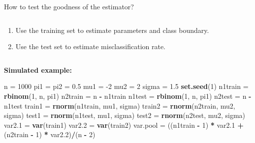 \documentclass[10pt,ignorenonframetext,]{beamer}
\newenvironment{Shaded}{\begin{snugshade}}{\end{snugshade}}
\newcommand{\DecValTok}[1]{\textcolor[rgb]{0.00,0.00,0.81}{#1}}
\newcommand{\FloatTok}[1]{\textcolor[rgb]{0.00,0.00,0.81}{#1}}
\newcommand{\KeywordTok}[1]{\textcolor[rgb]{0.13,0.29,0.53}{\textbf{#1}}}
\newcommand{\NormalTok}[1]{#1}
\newcommand{\OperatorTok}[1]{\textcolor[rgb]{0.81,0.36,0.00}{\textbf{#1}}}
\newcommand{\StringTok}[1]{\textcolor[rgb]{0.31,0.60,0.02}{#1}}
\providecommand{\tightlist}{%
  \setlength{\itemsep}{0pt}\setlength{\parskip}{0pt}}
\begin{document}
\begin{frame}[fragile]

\begin{block}{How to test the goodness of the estimator?}

\(~\)

\begin{enumerate}
\tightlist
\item
  Use the training set to estimate parameters and class boundary.
\item
  Use the test set to estimate misclassification rate.
\end{enumerate}

\(~\)

\textbf{Simulated example:}

\vspace{2mm}

\scriptsize

\begin{Shaded}
\begin{Highlighting}[]
\NormalTok{n =}\StringTok{ }\DecValTok{1000}
\NormalTok{pi1 =}\StringTok{ }\NormalTok{pi2 =}\StringTok{ }\FloatTok{0.5}
\NormalTok{mu1 =}\StringTok{ }\DecValTok{-2}
\NormalTok{mu2 =}\StringTok{ }\DecValTok{2}
\NormalTok{sigma =}\StringTok{ }\FloatTok{1.5}
\KeywordTok{set.seed}\NormalTok{(}\DecValTok{1}\NormalTok{)}
\NormalTok{n1train =}\StringTok{ }\KeywordTok{rbinom}\NormalTok{(}\DecValTok{1}\NormalTok{, n, pi1)}
\NormalTok{n2train =}\StringTok{ }\NormalTok{n }\OperatorTok{-}\StringTok{ }\NormalTok{n1train}
\NormalTok{n1test =}\StringTok{ }\KeywordTok{rbinom}\NormalTok{(}\DecValTok{1}\NormalTok{, n, pi1)}
\NormalTok{n2test =}\StringTok{ }\NormalTok{n }\OperatorTok{-}\StringTok{ }\NormalTok{n1test}
\NormalTok{train1 =}\StringTok{ }\KeywordTok{rnorm}\NormalTok{(n1train, mu1, sigma)}
\NormalTok{train2 =}\StringTok{ }\KeywordTok{rnorm}\NormalTok{(n2train, mu2, sigma)}
\NormalTok{test1 =}\StringTok{ }\KeywordTok{rnorm}\NormalTok{(n1test, mu1, sigma)}
\NormalTok{test2 =}\StringTok{ }\KeywordTok{rnorm}\NormalTok{(n2test, mu2, sigma)}
\NormalTok{var2}\FloatTok{.1}\NormalTok{ =}\StringTok{ }\KeywordTok{var}\NormalTok{(train1)}
\NormalTok{var2}\FloatTok{.2}\NormalTok{ =}\StringTok{ }\KeywordTok{var}\NormalTok{(train2)}
\NormalTok{var.pool =}\StringTok{ }\NormalTok{((n1train }\OperatorTok{-}\StringTok{ }\DecValTok{1}\NormalTok{) }\OperatorTok{*}\StringTok{ }\NormalTok{var2}\FloatTok{.1} \OperatorTok{+}\StringTok{ }\NormalTok{(n2train }\OperatorTok{-}\StringTok{ }\DecValTok{1}\NormalTok{) }\OperatorTok{*}\StringTok{ }\NormalTok{var2}\FloatTok{.2}\NormalTok{)}\OperatorTok{/}\NormalTok{(n }\OperatorTok{-}\StringTok{ }\DecValTok{2}\NormalTok{)}
\end{Highlighting}
\end{Shaded}

\end{block}

\end{frame}
\end{document}
